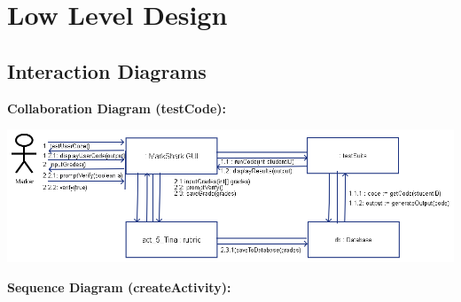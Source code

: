 \documentclass{article}
\begin{document}
\section{Low Level Design}
\subsection{Interaction Diagrams}
\textbf{Collaboration Diagram (testCode):}\\
\centerline{\includegraphics[scale=0.5]{../images/designDocImages/Collaboration_Diagram_Use_Case.png}}
\clearpage
\textbf{Sequence Diagram (createActivity):}\\
\end{document}
